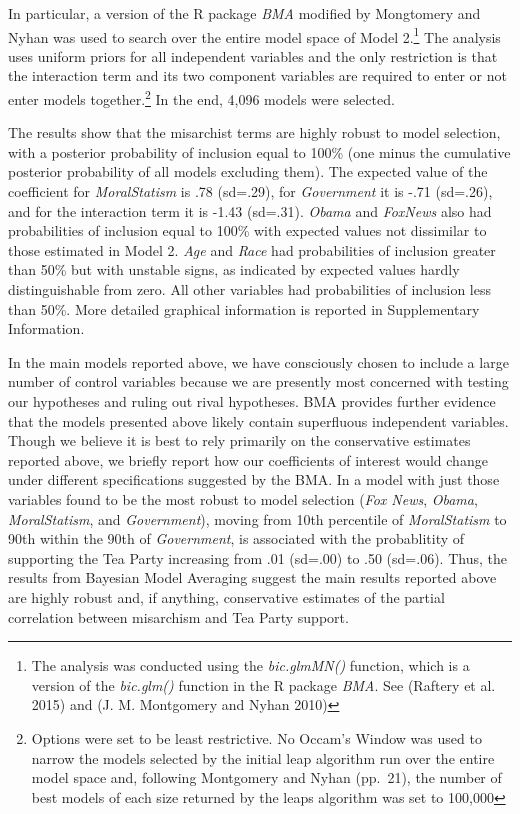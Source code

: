 \documentclass[12pt,]{article}
\begin{document}
In particular, a version of the R package \emph{BMA} modified by
Mongtomery and Nyhan was used to search over the entire model space of
Model 2.\footnote{The analysis was conducted using the
  \emph{bic.glmMN()} function, which is a version of the
  \emph{bic.glm()} function in the R package \emph{BMA}. See (Raftery et
  al. 2015) and (J. M. Montgomery and Nyhan 2010)} The analysis uses
uniform priors for all independent variables and the only restriction is
that the interaction term and its two component variables are required
to enter or not enter models together.\footnote{Options were set to be
  least restrictive. No Occam's Window was used to narrow the models
  selected by the initial leap algorithm run over the entire model space
  and, following Montgomery and Nyhan (pp.~21), the number of best
  models of each size returned by the leaps algorithm was set to 100,000}
In the end, 4,096 models were selected.

The results show that the misarchist terms are highly robust to model
selection, with a posterior probability of inclusion equal to 100\% (one
minus the cumulative posterior probability of all models excluding
them). The expected value of the coefficient for \emph{MoralStatism} is
.78 (sd=.29), for \emph{Government} it is -.71 (sd=.26), and for the
interaction term it is -1.43 (sd=.31). \emph{Obama} and \emph{FoxNews}
also had probabilities of inclusion equal to 100\% with expected values
not dissimilar to those estimated in Model 2. \emph{Age} and \emph{Race}
had probabilities of inclusion greater than 50\% but with unstable
signs, as indicated by expected values hardly distinguishable from zero.
All other variables had probabilities of inclusion less than 50\%. More
detailed graphical information is reported in Supplementary Information.

In the main models reported above, we have consciously chosen to include
a large number of control variables because we are presently most
concerned with testing our hypotheses and ruling out rival hypotheses.
BMA provides further evidence that the models presented above likely
contain superfluous independent variables. Though we believe it is best
to rely primarily on the conservative estimates reported above, we
briefly report how our coefficients of interest would change under
different specifications suggested by the BMA. In a model with just
those variables found to be the most robust to model selection
(\emph{Fox News}, \emph{Obama}, \emph{MoralStatism}, and
\emph{Government}), moving from 10th percentile of \emph{MoralStatism}
to 90th within the 90th of \emph{Government}, is associated with the
probablitity of supporting the Tea Party increasing from .01 (sd=.00) to
.50 (sd=.06). Thus, the results from Bayesian Model Averaging suggest
the main results reported above are highly robust and, if anything,
conservative estimates of the partial correlation between misarchism and
Tea Party support.
\end{document}
